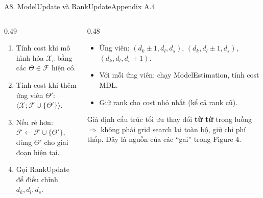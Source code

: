 \begin{frame}{A8. ModelUpdate và RankUpdate}{Appendix A.4}
\begin{columns}[T,onlytextwidth]
\begin{column}{0.49\textwidth}
\begin{mathcard}
  \small
  \begin{enumerate}
    \item Tính cost khi mô hình hóa $\mathcal X_c$ bằng các $\Theta\in\mathcal F$ hiện có.
    \item Tính cost khi thêm ứng viên $\Theta'$: $\langle\mathcal X;\mathcal F\cup\{\Theta'\}\rangle$.
    \item Nếu rẻ hơn: $\mathcal F\leftarrow\mathcal F\cup\{\Theta'\}$, dùng $\Theta'$ cho giai đoạn hiện tại.
    \item Gọi RankUpdate để điều chỉnh $d_k,d_l,d_s$.
  \end{enumerate}
\end{mathcard}
\end{column}
\begin{column}{0.48\textwidth}
\begin{mathcard}
  \small
  \begin{itemize}
    \item Ứng viên: $(d_k\pm1,d_l,d_s)$, $(d_k,d_l\pm1,d_s)$, $(d_k,d_l,d_s\pm1)$.
    \item Với mỗi ứng viên: chạy ModelEstimation, tính cost MDL.
    \item Giữ rank cho cost nhỏ nhất (kể cả rank cũ).
  \end{itemize}
\end{mathcard}
\vspace{2mm}
\begin{intuition}
  \small Giả định cấu trúc tối ưu thay đổi \textbf{từ từ} trong luồng $\Rightarrow$ không phải grid search lại toàn bộ, giữ chi phí thấp. Đây là nguồn của các ``gai'' trong Figure 4.
\end{intuition}
\end{column}
\end{columns}
\vfill
{}
\end{frame}
